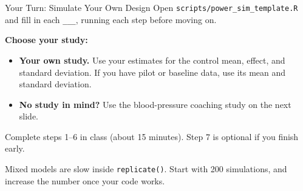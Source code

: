 \documentclass[
  ignorenonframetext,
  aspectratio=169,
]{beamer}
\providecommand{\tightlist}{%
  \setlength{\itemsep}{0pt}\setlength{\parskip}{0pt}}
\begin{document}
\begin{frame}{Your Turn: Simulate Your Own Design}
\label{your-turn-simulate-your-own-design}
\small Open \texttt{scripts/power\_sim\_template.R} and fill in each
\texttt{\_\_\_}, running each step before moving on.

\vspace{0.4em}

\textbf{Choose your study:}

\begin{itemize}
\tightlist
\item
  \textbf{Your own study.} Use your estimates for the control mean,
  effect, and standard deviation. If you have pilot or baseline data,
  use its mean and standard deviation.
\item
  \textbf{No study in mind?} Use the blood-pressure coaching study on
  the next slide.
\end{itemize}

\vspace{0.4em}

Complete steps 1--6 in class (about 15 minutes). Step 7 is optional if
you finish early.

\vspace{0.4em}

\scriptsize Mixed models are slow inside \texttt{replicate()}. Start
with 200 simulations, and increase the number once your code works.
\end{frame}
\end{document}
